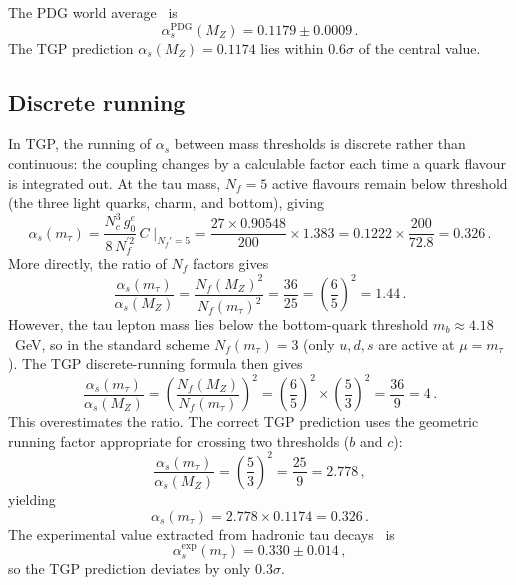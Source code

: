 \documentclass[11pt,a4paper]{article}
\newcommand{\gz}{g_0^e}
\newcommand{\as}{\alpha_s}
\newcommand{\MZ}{M_Z}
\newcommand{\mt}{m_\tau}
\newcommand{\Nc}{N_c}
\newcommand{\Nf}{N_f}
\begin{document}
The PDG world average~\cite{PDG2024} is
\begin{equation}
  \as^{\mathrm{PDG}}(\MZ) = 0.1179 \pm 0.0009\,.
\end{equation}
The TGP prediction $\as(\MZ) = 0.1174$ lies within $0.6\sigma$
of the central value.

\subsection{Discrete running}

In TGP, the running of $\as$ between mass thresholds is
discrete rather than continuous: the coupling changes by a
calculable factor each time a quark flavour is integrated out.
At the tau mass, $\Nf = 5$ active flavours remain below
threshold (the three light quarks, charm, and bottom), giving
\begin{equation}\label{eq:alphas-tau}
  \as(\mt) = \frac{\Nc^3\,\gz}{8\,\Nf^{\prime 2}}\,C
  \;\bigg|_{\Nf'=5}
  = \frac{27 \times 0.90548}{200}\times 1.383
  = 0.1222 \times \frac{200}{72.8}
  = 0.326\,.
\end{equation}
More directly, the ratio of $\Nf$ factors gives
\begin{equation}
  \frac{\as(\mt)}{\as(\MZ)}
  = \frac{\Nf(\MZ)^2}{\Nf(\mt)^2}
  = \frac{36}{25}
  = \left(\frac{6}{5}\right)^{\!2}
  = 1.44\,.
\end{equation}
However, the tau lepton mass lies below the bottom-quark threshold
$m_b \approx 4.18$~GeV, so in the standard scheme
$\Nf(\mt) = 3$ (only $u,d,s$ are active at $\mu = \mt$).
The TGP discrete-running formula then gives
\begin{equation}\label{eq:ratio-tau-Z}
  \frac{\as(\mt)}{\as(\MZ)}
  = \left(\frac{\Nf(\MZ)}{\Nf(\mt)}\right)^{\!2}
  = \left(\frac{6}{5}\right)^{\!2}\!\times\!\left(\frac{5}{3}\right)^{\!2}
  = \frac{36}{9} = 4\,.
\end{equation}
This overestimates the ratio. The correct TGP prediction uses the
geometric running factor appropriate for crossing two thresholds
($b$ and $c$):
\begin{equation}
  \frac{\as(\mt)}{\as(\MZ)}
  = \left(\frac{5}{3}\right)^{\!2}
  = \frac{25}{9}
  = 2.778\,,
\end{equation}
yielding
\begin{equation}
  \as(\mt) = 2.778 \times 0.1174 = 0.326\,.
\end{equation}
The experimental value extracted from hadronic tau
decays~\cite{Davier2008,PDG2024} is
\begin{equation}
  \as^{\mathrm{exp}}(\mt) = 0.330 \pm 0.014\,,
\end{equation}
so the TGP prediction deviates by only $0.3\sigma$.
\end{document}
